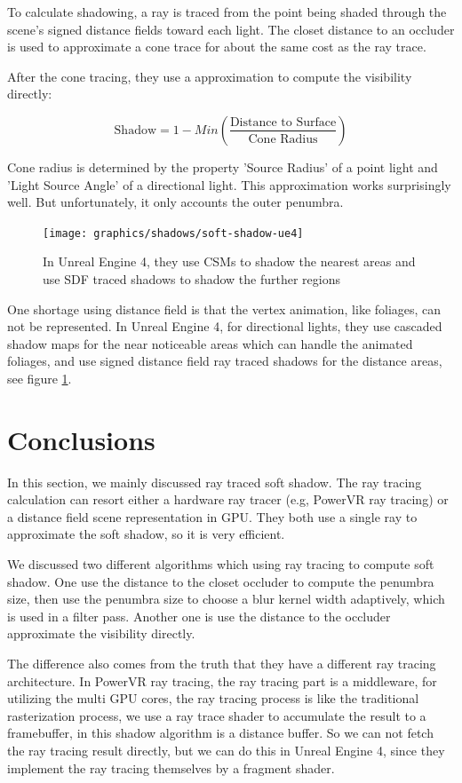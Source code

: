 To calculate shadowing, a ray is traced from the point being shaded through the scene's signed distance fields toward each light. The closet distance to an occluder is used to approximate a cone trace for about the same cost as the ray trace.

After the cone tracing, they use a approximation to compute the visibility directly:

\begin{equation}
	\text{Shadow}=1-Min(\frac{\text{Distance to Surface}}{\text{Cone Radius}})
\end{equation}

Cone radius is determined by the property 'Source Radius' of a point light and 'Light Source Angle' of a directional light. This approximation works surprisingly well. But unfortunately, it only accounts the outer penumbra.

\begin{figure}\label{f:soft-shadow-ue4}
	\texttt{[image: graphics/shadows/soft-shadow-ue4]}
	\caption{In Unreal Engine 4, they use CSMs to shadow the nearest areas and use SDF traced shadows to shadow the further regions}
\end{figure}

One shortage using distance field is that the vertex animation, like foliages, can not be represented. In Unreal Engine 4, for directional lights, they use cascaded shadow maps for the near noticeable areas which can handle the animated foliages, and use signed distance field ray traced shadows for the distance areas, see figure \ref{f:soft-shadow-ue4}.


\section{Conclusions}
In this section, we mainly discussed ray traced soft shadow. The ray tracing calculation can resort either a hardware ray tracer (e.g, PowerVR ray tracing) or a distance field scene representation in GPU. They both use a single ray to approximate the soft shadow, so it is very efficient. 

We discussed two different algorithms which using ray tracing to compute soft shadow. One use the distance to the closet occluder to compute the penumbra size, then use the penumbra size to choose a blur kernel width adaptively, which is used in a filter pass. Another one is use the distance to the occluder approximate the visibility directly.

The difference also comes from the truth that they have a different ray tracing architecture. In PowerVR ray tracing, the ray tracing part is a middleware, for utilizing the multi GPU cores, the ray tracing process is like the traditional rasterization process, we use a ray trace shader to accumulate the result to a framebuffer, in this shadow algorithm is a distance buffer. So we can not fetch the ray tracing result directly, but we can do this in Unreal Engine 4, since they implement the ray tracing themselves by a fragment shader.

